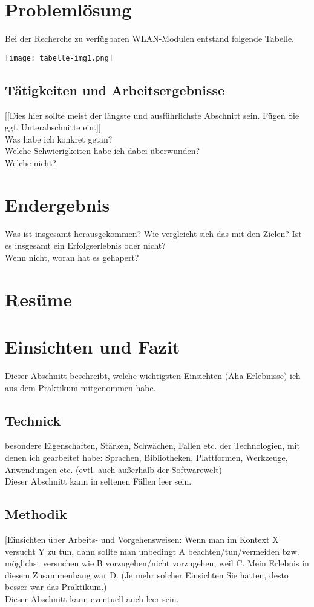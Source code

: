 \documentclass[pdftex,12pt,a4paper]{scrreprt}
\begin{document}
\section{Problemlösung}
Bei der Recherche zu verfügbaren WLAN-Modulen entstand folgende Tabelle.
\begin{center}
\texttt{[image: tabelle-img1.png]}
\end{center}

\subsection{Tätigkeiten und Arbeitsergebnisse}
[[Dies hier sollte meist der längste und ausführlichste Abschnitt sein. Fügen Sie ggf.
Unterabschnitte ein.]]\\
Was habe ich konkret getan?\\
Welche Schwierigkeiten habe ich dabei überwunden?\\
Welche nicht?\\

\section{Endergebnis}
Was ist insgesamt herausgekommen?
Wie vergleicht sich das mit den Zielen? Ist es insgesamt ein Erfolgserlebnis oder nicht?\\
Wenn nicht, woran hat es gehapert?\\
\section{Resüme}
\section{Einsichten und Fazit}
Dieser Abschnitt beschreibt, welche wichtigsten Einsichten (Aha-Erlebnisse) ich aus dem
Praktikum mitgenommen habe.

\subsection{Technick}
besondere Eigenschaften, Stärken, Schwächen, Fallen etc. der Technologien, mit denen
ich gearbeitet habe: Sprachen, Bibliotheken, Plattformen, Werkzeuge, Anwendungen etc.
(evtl. auch außerhalb der Softwarewelt)\\
Dieser Abschnitt kann in seltenen Fällen leer sein.

\subsection{Methodik}
[Einsichten über Arbeits- und Vorgehensweisen: Wenn man im Kontext X versucht Y zu
tun, dann sollte man unbedingt A beachten/tun/vermeiden bzw. möglichst versuchen wie
B vorzugehen/nicht vorzugehen, weil C. Mein Erlebnis in diesem Zusammenhang war D.
(Je mehr solcher Einsichten Sie hatten, desto besser war das Praktikum.)\\
Dieser Abschnitt kann eventuell auch leer sein.
\end{document}
